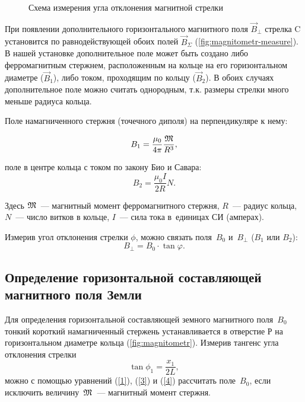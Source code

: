\begin{wrapfigure}{r}{0.4\textwidth}
	\caption{Схема измерения угла отклонения магнитной стрелки}
\end{wrapfigure}

При появлении дополнительного горизонтального магнитного поля $\vec{B}_{\perp}$ стрелка C установится по равнодействующей
обоих полей $\vec{B}_{\Sigma}$ (\ref{fig:magnitometr-measure}). В нашей установке дополнительное поле может быть создано либо ферромагнитным
стержнем, расположенным на кольце на его горизонтальном диаметре ($\vec{B}_1$), либо током, проходящим по кольцу
($\vec{B}_2$). В обоих случаях дополнительное поле можно считать однородным, т.к. размеры стрелки много меньше радиуса
кольца.

Поле намагниченного стержня (точечного диполя) на перпендикуляре к нему:

\begin{equation}
    B_1=\frac{\mu_0}{4\pi}\frac{\mathfrak M}{R^3},
\end{equation}

поле в центре кольца с током по закону Био и Савара:
\begin{equation}
    B_2=\frac{\mu_0 I}{2R}N.
\end{equation}

Здесь $\mathfrak M$~--- магнитный момент ферромагнитного стержня, $R$~--- радиус кольца, $N$~--- число витков в кольце,
$I$~--- сила тока в~единицах СИ (амперах).

Измерив угол отклонения стрелки $\phi$, можно связать поля~$B_0$ и~$B_{\perp}$ ($B_1$ или $B_2$):
\begin{equation}
    B_{\perp}=B_0\cdot \tan{\varphi}.
\end{equation}

\subsection*{Определение горизонтальной составляющей магнитного поля Земли}

Для определения горизонтальной составляющей земного магнитного поля~$B_0$ тонкий короткий намагниченный стержень
устанавливается в отверстие Р на горизонтальном диаметре кольца (\ref{fig:magnitometr}). Измерив тангенс угла отклонения стрелки
\begin{equation}
    \tan\phi_1=\frac{x_1}{2L},
\end{equation}
можно с помощью уравнений (\eqref{1}), (\eqref{3}) и (\eqref{4}) рассчитать поле~$B_0$, если исключить величину~$\mathfrak M$~--- магнитный
момент стержня.

